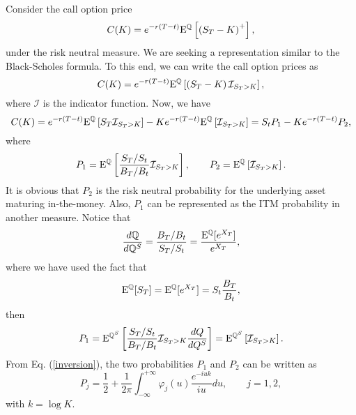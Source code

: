\documentclass[12pt]{article}
\begin{document}
    Consider the call option price
    \begin{equation}
      C(K)=e^{-r(T-t)}{\rm E}^{\mathbb{Q}}\left[\left(S_T-K\right)^+\right],
    \end{equation}
    under the risk neutral measure.
    We are seeking a representation similar to the Black-Scholes formula. To this end, we can write the
    call option prices as
    \begin{equation}
      C(K)=e^{-r(T-t)}{\rm E}^{\mathbb{Q}}\left[\left(S_T-K\right){\mathcal I}_{S_T>K}\right],
    \end{equation}
    where ${\mathcal I}$ is the indicator function. Now, we have
    \begin{equation}
      C(K)=e^{-r(T-t)}{\rm E}^{\mathbb{Q}}\left[S_T{\mathcal I}_{S_T>K}\right]-Ke^{-r(T-t)}{\rm E}^{\mathbb{Q}}\left[{\mathcal I}_{S_T>K}\right]
          =S_tP_1 - Ke^{-r(T-t)}P_2,
    \end{equation}
    where
    \begin{equation}
      P_1 = {\rm E}^{\mathbb{Q}}\left[\frac{S_T/S_t}{B_T/B_t}{\mathcal I}_{S_T>K}\right],\quad\quad
      P_2 = {\rm E}^{\mathbb{Q}}\left[{\mathcal I}_{S_T>K}\right].
    \end{equation}
    It is obvious that $P_2$ is the risk neutral probability for the underlying asset maturing in-the-money. Also, $P_1$ can
    be represented as the ITM probability in another measure. Notice that
    \begin{equation}
      \frac{d{\mathbb{Q}}}{d{\mathbb{Q}}^S}=\frac{B_T/B_t}{S_T/S_t}=\frac{{\rm E}^{\mathbb{Q}}[e^{X_T}]}{e^{X_T}},
    \end{equation}
    where we have used the fact that
    \begin{equation}
      {\rm E}^{\mathbb{Q}}[S_T]={\rm E}^{\mathbb{Q}}[e^{X_T}]=S_t\frac{B_T}{B_t},
    \end{equation}
    then
    \begin{equation}
      P_1 = {\rm E}^{{\mathbb{Q}^S}}\left[\frac{S_T/S_t}{B_T/B_t}{\mathcal I}_{S_T>K}\frac{dQ}{dQ^S}\right]
          = {\rm E}^{{\mathbb{Q}^S}}\left[{\mathcal I}_{S_T>K}\right].
    \end{equation}
    From Eq. (\ref{inversion}), the two probabilities $P_1$ and $P_2$ can be written as
    \begin{equation}
      P_j=\frac{1}{2}+\frac{1}{2\pi}\int_{-\infty}^{+\infty}\varphi_j(u)\frac{e^{-iuk}}{iu}du, \quad\quad j=1,2,
    \end{equation}
    with $k=\log K$.
\end{document}
